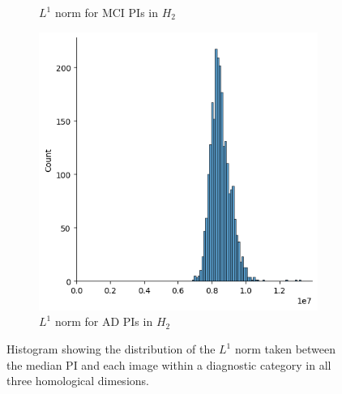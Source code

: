 \documentclass{article}
\begin{document}
\begin{figure}
\begin{subfigure}{0.32\textwidth}
    \caption{$L^1$ norm for MCI PIs in $H_2$}
  \end{subfigure}
  \begin{subfigure}{0.32\textwidth}
    \includegraphics[width=\textwidth]{figures/PIs/displot_median_pi_AD_H_2.png}
    \caption{$L^1$ norm for AD PIs in $H_2$}
  \end{subfigure}
  \caption{Histogram showing the distribution of the $L^1$ norm taken between the median PI and each
    image within a diagnostic category in all three homological dimesions.}
  \label{fig:displots_median_pi}
\end{figure}
\end{document}
